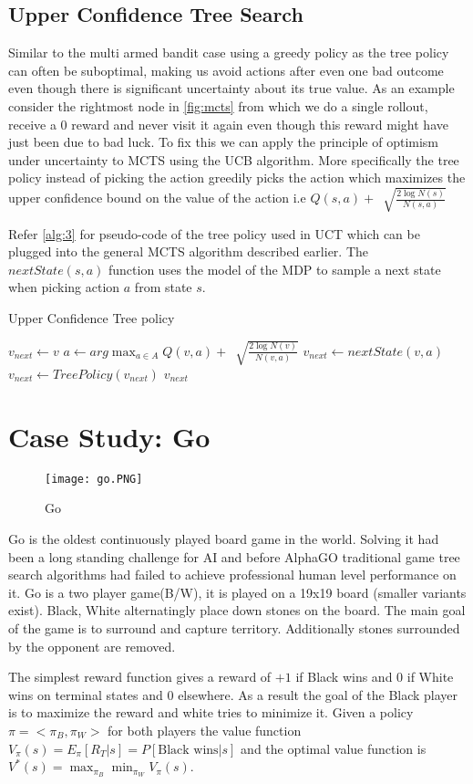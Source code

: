 \documentclass{article}
\begin{document}
\subsection{Upper Confidence Tree Search}
Similar to the multi armed bandit case using a greedy policy as the tree policy can often be suboptimal, making us avoid actions after even one bad outcome even though there is significant uncertainty about its true value. As an example consider the rightmost node in \ref{fig:mcts} from which we do a single rollout, receive a 0 reward and never visit it again even though this reward might have just been due to bad luck.
To fix this we can apply the principle of optimism under uncertainty to MCTS using the UCB algorithm. More specifically the tree policy instead of picking the action greedily picks the action which maximizes the upper confidence bound on the value of the action i.e $Q(s,a)+~\sqrt[]{\frac{2\log N(s)}{N(s,a)}}$ \par
Refer \ref{alg:3} for pseudo-code of the tree policy used in UCT which can be plugged into the general MCTS algorithm described earlier. The $nextState(s,a)$ function uses the model of the MDP to sample a next state when picking action $a$ from state $s$.
\begin{algorithm}
\caption{Upper Confidence Tree policy}\label{alg:3}
\begin{algorithmic}[1]
\State $v_{next}\leftarrow v$
\State $a\leftarrow arg\max_{a\in A} Q(v,a)+~\sqrt[]{\frac{2\log N(v)}{N(v,a)}}$
\State $v_{next} \leftarrow nextState(v,a)$
\State $v_{next}\leftarrow TreePolicy(v_{next})$
\EndIf
\Return $v_{next}$
\EndFunction
\end{algorithmic}
\end{algorithm}
\section{Case Study: Go}
\begin{figure}
\centering

\texttt{[image: go.PNG]}
\caption{Go}
\end{figure}
Go is the oldest continuously played board game in the world. Solving it had been a long standing challenge for AI and before AlphaGO traditional game tree search algorithms had failed to achieve professional human level performance on it. Go is a two player game(B/W), it is played on a 19x19 board (smaller variants exist). Black, White alternatingly place down stones on the board. The main goal of the game is to surround and capture territory. Additionally stones surrounded by the opponent are removed. \par
The simplest reward function gives a reward of $+1$ if Black wins and $0$ if White wins on terminal states and 0 elsewhere. As a result the goal of the Black player is to maximize the reward and white tries to minimize it. Given a policy $\pi=<\pi_B,\pi_W>$ for both players the value function $V_\pi(s)=E_\pi[R_T|s]=P[\text{Black wins}|s]$ and the optimal value function is $V^*(s)=\max_{\pi_B}\min_{\pi_W}V_\pi(s)$.
\end{document}
